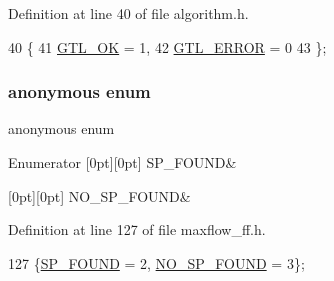 Definition at line 40 of file algorithm.\+h.


\begin{DoxyCode}
40          \{
41     \mbox{\hyperlink{classalgorithm_af1a0078e153aa99c24f9bdf0d97f6710a5114c20e4a96a76b5de9f28bf15e282b}{GTL\_OK}} = 1,
42     \mbox{\hyperlink{classalgorithm_af1a0078e153aa99c24f9bdf0d97f6710a6fcf574690bbd6cf710837a169510dd7}{GTL\_ERROR}} = 0
43     \};
\end{DoxyCode}
\mbox{\label{classmaxflow__ff_a08dc6e5c5fe20a9f9d93721f8c273592}} 
\subsubsection{\texorpdfstring{anonymous enum}{anonymous enum}}
{\footnotesize\ttfamily anonymous enum\hspace{0.3cm}{\ttfamily [protected]}}

\begin{DoxyEnumFields}{Enumerator}
[0pt][0pt]{}\mbox{\label{classmaxflow__ff_a08dc6e5c5fe20a9f9d93721f8c273592acf4f271b476cce9871e48ba446283d64}} 
S\+P\+\_\+\+F\+O\+U\+ND&\\
\hline

[0pt][0pt]{}\mbox{\label{classmaxflow__ff_a08dc6e5c5fe20a9f9d93721f8c273592adc2a7638ed9e892fb272d6b9e1dda399}} 
N\+O\+\_\+\+S\+P\+\_\+\+F\+O\+U\+ND&\\
\hline

\end{DoxyEnumFields}


Definition at line 127 of file maxflow\+\_\+ff.\+h.


\begin{DoxyCode}
127 \{\mbox{\hyperlink{classmaxflow__ff_a08dc6e5c5fe20a9f9d93721f8c273592acf4f271b476cce9871e48ba446283d64}{SP\_FOUND}} = 2, \mbox{\hyperlink{classmaxflow__ff_a08dc6e5c5fe20a9f9d93721f8c273592adc2a7638ed9e892fb272d6b9e1dda399}{NO\_SP\_FOUND}} = 3\};
\end{DoxyCode}


